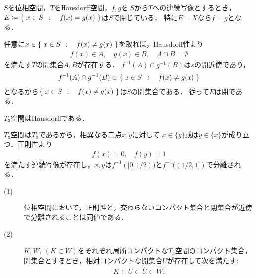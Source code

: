	\begin{screen}
		\begin{thm}[Hausdorff空間値連続写像の等価域は閉]
		\label{thm:equivalence_set_of_two_mappings_into_Hausdorff_space_is_closed}
			$S$を位相空間，$T$をHausdorff空間，$f,g$を
			$S$から$T$への連続写像とするとき，$E \coloneqq \left\{\ x \in S\ \, : \quad f(x) = g(x)\ \right\}$は$S$で閉じている．
			特に$\overline{E}=X$なら$f=g$となる．
		\end{thm}
	\end{screen}
	
	\begin{prf}
		任意に$x \in \left\{\ x \in S\ \, : \quad f(x) \neq g(x)\ \right\}$を取れば，Hausdorff性より
		\begin{align}
			f(x) \in A,\quad g(x) \in B,\quad A \cap B = \emptyset
		\end{align}
		を満たす$T$の開集合$A,B$が存在する．
		$f^{-1}(A) \cap g^{-1}(B)$は$x$の開近傍であり，
		\begin{align}
			f^{-1}(A) \cap g^{-1}(B) \subset \left\{\ x \in S\ \, : \quad f(x) \neq g(x)\ \right\}
		\end{align}
		となるから$\left\{\ x \in S\ \, : \quad f(x) \neq g(x)\ \right\}$は$S$の開集合である．
		従って$E$は閉である．
		\QED
	\end{prf}
	
	\begin{screen}
		\begin{thm}[$T_3 \Longrightarrow T_2$]
			$T_3$空間はHausdorffである．
		\end{thm}
	\end{screen}
	
	\begin{prf}
		$T_3$空間は$T_0$であるから，相異なる二点$x,y$に対して
		$x \in \overline{\{y\}}$或は$y \in \overline{\{x\}}$が成り立つ．正則性より
		\begin{align}
			f(x) = 0,\quad f(y) = 1
		\end{align}
		を満たす連続写像が存在し，$x,y$は$f^{-1}([0,1/2))$と$f^{-1}((1/2,1])$で分離される．
		\QED
	\end{prf}
	
	\begin{screen}
		\begin{thm}[正則空間とは交わらないコンパクト集合と閉集合が近傍で分離される空間]
		\label{thm:each_point_in_regular_space_has_closesd_local_base}\mbox{}
			\begin{description}
				\item[(1)] 位相空間において，正則性と，交わらないコンパクト集合と閉集合が近傍で分離されることは同値である．
					
				\item[(2)]
					$K,W,\ (K \subset W)$をそれぞれ局所コンパクトな$T_3$空間のコンパクト集合，
					開集合とするとき，相対コンパクトな開集合$U$が存在して次を満たす:
					\begin{align}
						K \subset U \subset \overline{U} \subset W.
						\label{eq:thm_each_point_in_regular_space_has_closesd_local_base}
					\end{align}
			\end{description}
		\end{thm}
	\end{screen}
	

